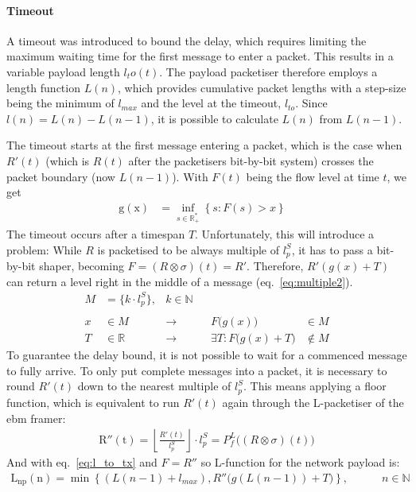 \paragraph{Timeout}
A timeout was introduced to bound the delay, which requires limiting the maximum waiting time for the first message to enter a packet. This results in a variable payload length $l_to(t)$.
The payload packetiser therefore employs a length function $L(n)$,  which provides cumulative packet lengths with a step-size being the minimum of $l_{max}$ and the level at the timeout, $l_{to}$.
Since $l(n) = L(n) - L(n-1)$, it is possible to calculate $L(n)$ from $L(n-1)$.
\par
The timeout starts at the first message entering a packet, which is the case when $R'(t)$ (which is $R(t)$ after the packetisers bit-by-bit system) crosses the packet boundary (now $L(n-1)$).
With $F(t)$ being the flow level at time $t$, we get
%
\begin{align}
\mathrm{g(x)}   &= \inf_{s \in \mathbb{R_+^*}}\left\{ s : F(s) > x \right\} &
\label{eq:tstartk}
\end{align}
%
The timeout occurs after a timespan $T$. Unfortunately, this will introduce a problem:
While $R$ is packetised to be always multiple of $l^S_p$, it has to pass a bit-by-bit shaper, becoming $F = (R \otimes \sigma)(t) = R'$.
Therefore, $R'(g(x) + T)$ can return a level right in the middle of a message (eq.~\ref{eq:multiple2}).
%
\begin{equation}
\begin{aligned}
M &= \{ k \cdot l^S_p\},& k \in \mathbb{N}&&&\\
\\
x &\in M &\to&&F\big(g(x)\big) &\in M\\
T &\in \mathbb{R}&\to&& \exists T  : F\big(g(x)+T\big) &\notin M
\label{eq:multiple2}
\end{aligned}
\end{equation}
%
To guarantee the delay bound, it is not possible to wait for a commenced message to fully arrive.
To only put complete messages into a packet, it is necessary to round $R'(t)$ down to the nearest multiple of $l^S_p$.
This means applying a floor function, which is equivalent to run $R'(t)$ again through the L-packetiser of the \gls{ebm} framer:
%
\begin{align}
\mathrm{R''(t)} = \left \lfloor{\frac{R'(t)}{l^S_p}}\right \rfloor  \cdot l^S_p = P^L_f\big((R \otimes \sigma)(t)\big)
\label{eq:l_to_tx}
\end{align}
%
And with eq.~\ref{eq:l_to_tx} and $F = R''$ so L-function for the network payload is:
%
\begin{align}
\mathrm{L_{np}(n)} =  \min \left \{(L(n-1) + l_{max}),  R''\big(g(L(n-1)) + T \big) \right \}, \hspace{3em} n \in \mathbb{N}
\label{eq:l_nw}
\end{align}
%
